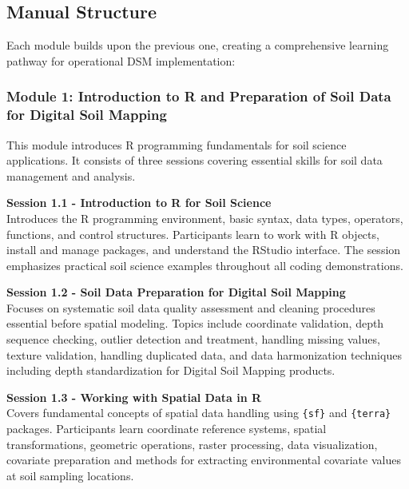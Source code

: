 \documentclass[
  10pt,
  b5paper,
  oneside]{book}
\begin{document}
\subsection*{Manual Structure}\label{manual-structure}

Each module builds upon the previous one, creating a comprehensive learning pathway for operational DSM implementation:

\subsubsection*{\texorpdfstring{\textbf{Module 1: Introduction to R and Preparation of Soil Data for Digital Soil Mapping}}{Module 1: Introduction to R and Preparation of Soil Data for Digital Soil Mapping}}\label{module-1-introduction-to-r-and-preparation-of-soil-data-for-digital-soil-mapping}

This module introduces R programming fundamentals for soil science applications. It consists of three sessions covering essential skills for soil data management and analysis.

\textbf{Session 1.1 - Introduction to R for Soil Science}\\
Introduces the R programming environment, basic syntax, data types, operators, functions, and control structures. Participants learn to work with R objects, install and manage packages, and understand the RStudio interface. The session emphasizes practical soil science examples throughout all coding demonstrations.

\textbf{Session 1.2 - Soil Data Preparation for Digital Soil Mapping}\\
Focuses on systematic soil data quality assessment and cleaning procedures essential before spatial modeling. Topics include coordinate validation, depth sequence checking, outlier detection and treatment, handling missing values, texture validation, handling duplicated data, and data harmonization techniques including depth standardization for Digital Soil Mapping products.

\textbf{Session 1.3 - Working with Spatial Data in R}\\
Covers fundamental concepts of spatial data handling using \texttt{\{sf\}} and \texttt{\{terra\}} packages. Participants learn coordinate reference systems, spatial transformations, geometric operations, raster processing, data visualization, covariate preparation and methods for extracting environmental covariate values at soil sampling locations.
\end{document}
